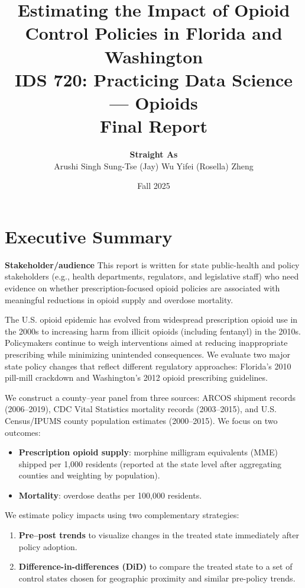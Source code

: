 \documentclass[11pt]{article}
\title{\vspace{-1.2cm}\textbf{\Large Estimating the Impact of Opioid Control Policies in Florida and Washington}\\[0.2cm]
\large IDS 720: Practicing Data Science --- Opioids \\
\large Final Report}
\author{\textbf{Straight As}\\[0.15cm]
Arushi Singh \quad \quad Sung-Tse (Jay) Wu \quad \quad Yifei (Rosella) Zheng}
\date{Fall 2025}
\begin{document}
\maketitle
\vspace{-0.6cm}

\section{Executive Summary}

\textbf{Stakeholder/audience} This report is written for state public-health and policy stakeholders (e.g., health departments, regulators, and legislative staff) who need evidence on whether prescription-focused opioid policies are associated with meaningful reductions in opioid supply and overdose mortality.

The U.S. opioid epidemic has evolved from widespread prescription opioid use in the 2000s to increasing harm from illicit opioids (including fentanyl) in the 2010s. Policymakers continue to weigh interventions aimed at reducing inappropriate prescribing while minimizing unintended consequences. We evaluate two major state policy changes that reflect different regulatory approaches: Florida's 2010 pill-mill crackdown and Washington's 2012 opioid prescribing guidelines.

We construct a county--year panel from three sources: ARCOS shipment records (2006--2019), CDC Vital Statistics mortality records (2003--2015), and U.S. Census/IPUMS county population estimates (2000--2015). We focus on two outcomes:
\begin{itemize}[leftmargin=*]
    \item \textbf{Prescription opioid supply}: morphine milligram equivalents (MME) shipped per 1{,}000 residents (reported at the state level after aggregating counties and weighting by population).
    \item \textbf{Mortality}: overdose deaths per 100{,}000 residents.
\end{itemize}

We estimate policy impacts using two complementary strategies:
\begin{enumerate}[leftmargin=*]
    \item \textbf{Pre--post trends} to visualize changes in the treated state immediately after policy adoption.
    \item \textbf{Difference-in-differences (DiD)} to compare the treated state to a set of control states chosen for geographic proximity and similar pre-policy trends.
\end{enumerate}
\end{document}
